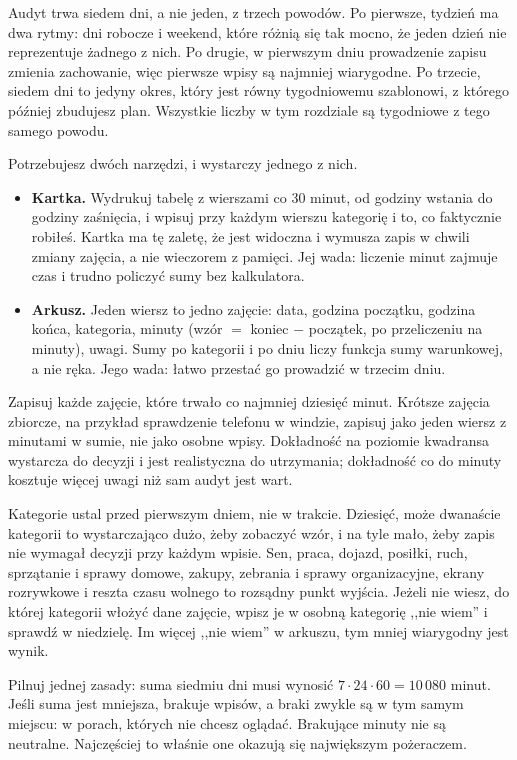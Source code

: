 Audyt trwa siedem dni, a nie jeden, z trzech powodów. Po pierwsze, tydzień ma dwa rytmy: dni robocze i weekend, które różnią się tak mocno, że jeden dzień nie reprezentuje żadnego z nich. Po drugie, w pierwszym dniu prowadzenie zapisu zmienia zachowanie, więc pierwsze wpisy są najmniej wiarygodne. Po trzecie, siedem dni to jedyny okres, który jest równy tygodniowemu szablonowi, z którego później zbudujesz plan. Wszystkie liczby w tym rozdziale są tygodniowe z tego samego powodu.

Potrzebujesz dwóch narzędzi, i wystarczy jednego z nich.

\begin{itemize}
  \item \textbf{Kartka.} Wydrukuj tabelę z wierszami co 30 minut, od godziny wstania do godziny zaśnięcia, i wpisuj przy każdym wierszu kategorię i to, co faktycznie robiłeś. Kartka ma tę zaletę, że jest widoczna i wymusza zapis w chwili zmiany zajęcia, a nie wieczorem z pamięci. Jej wada: liczenie minut zajmuje czas i trudno policzyć sumy bez kalkulatora.
  \item \textbf{Arkusz.} Jeden wiersz to jedno zajęcie: data, godzina początku, godzina końca, kategoria, minuty (wzór $=$ koniec $-$ początek, po przeliczeniu na minuty), uwagi. Sumy po kategorii i po dniu liczy funkcja sumy warunkowej, a nie ręka. Jego wada: łatwo przestać go prowadzić w trzecim dniu.
\end{itemize}

Zapisuj każde zajęcie, które trwało co najmniej dziesięć minut. Krótsze zajęcia zbiorcze, na przykład sprawdzenie telefonu w windzie, zapisuj jako jeden wiersz z minutami w sumie, nie jako osobne wpisy. Dokładność na poziomie kwadransa wystarcza do decyzji i jest realistyczna do utrzymania; dokładność co do minuty kosztuje więcej uwagi niż sam audyt jest wart.

Kategorie ustal przed pierwszym dniem, nie w trakcie. Dziesięć, może dwanaście kategorii to wystarczająco dużo, żeby zobaczyć wzór, i na tyle mało, żeby zapis nie wymagał decyzji przy każdym wpisie. Sen, praca, dojazd, posiłki, ruch, sprzątanie i sprawy domowe, zakupy, zebrania i sprawy organizacyjne, ekrany rozrywkowe i reszta czasu wolnego to rozsądny punkt wyjścia. Jeżeli nie wiesz, do której kategorii włożyć dane zajęcie, wpisz je w osobną kategorię ,,nie wiem'' i sprawdź w niedzielę. Im więcej ,,nie wiem'' w arkuszu, tym mniej wiarygodny jest wynik.

Pilnuj jednej zasady: suma siedmiu dni musi wynosić $7 \cdot 24 \cdot 60 = 10\,080$ minut. Jeśli suma jest mniejsza, brakuje wpisów, a braki zwykle są w tym samym miejscu: w porach, których nie chcesz oglądać. Brakujące minuty nie są neutralne. Najczęściej to właśnie one okazują się największym pożeraczem.

